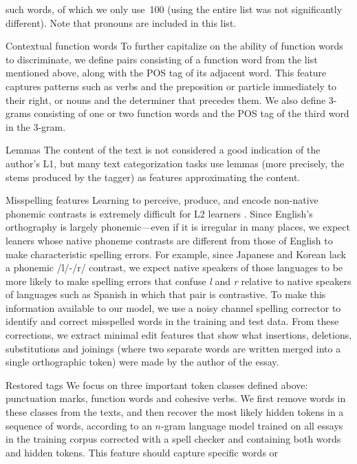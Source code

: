 \documentclass[11pt,letterpaper]{article}
\newcommand{\citep}[1]{\cite{#1}}
\newcommand{\textnl}{\textit}
\begin{document}
\begin{compactdesc}
  such words, of which we only use~100 (using the entire list was not
  significantly different). Note that pronouns are included in this list.
\item[Contextual function words] To further capitalize on the ability
  of function words to discriminate, we define pairs consisting of a
  function word from the list mentioned above, along with the POS tag
  of its adjacent word. This feature captures patterns such as verbs
  and the preposition or particle immediately to their right, or nouns
  and the determiner that precedes them. We also define 3-grams
  consisting of one or two function words and the POS tag of the third
  word in the 3-gram.
\item[Lemmas] The content of the text is not considered a good
  indication of the author's L1, but many text categorization tasks
  use lemmas (more precisely, the stems produced by the tagger) as
  features approximating the content.
\item[Misspelling features] Learning to perceive, produce, and encode non-native phonemic contrasts is extremely difficult for L2 learners \citep{hayes-harb:2008}. Since English's orthography is largely phonemic---even if it is irregular in many places, we expect leaners whose native phoneme contrasts are different from those of English to make characteristic spelling errors. For example, since Japanese and Korean lack a phonemic /l/-/r/ contrast, we expect native speakers of those languages to be more likely to make spelling errors that confuse \textnl{l} and \textnl{r} relative to native speakers of languages such as Spanish in which that pair is contrastive. To make this information available to our model, we use a noisy channel spelling corrector \citep{kernighan:1990} to identify and correct misspelled words in the training and test data. From these corrections, we extract minimal edit features that show what insertions, deletions, substitutions and joinings (where two separate words are written merged into a single orthographic token) were made by the author of the essay.
\item[Restored tags] We focus on three important token classes defined
  above: punctuation marks, function words and cohesive verbs. We
  first remove words in these classes from the texts, and then recover
  the most likely hidden tokens in a sequence of words, according to
  an $n$-gram language model trained on all essays in the training
  corpus corrected with a spell checker and containing both words and
  hidden tokens. This feature should capture specific words or

\end{compactdesc}
\end{document}
